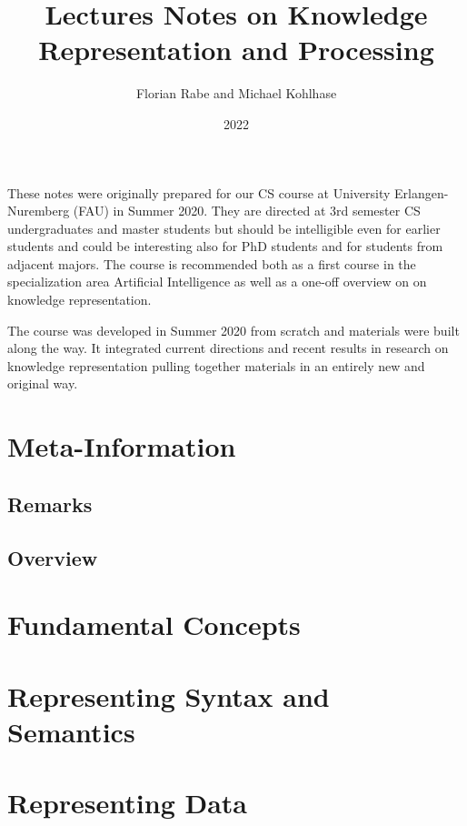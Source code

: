 \documentclass{book}
\title{Lectures Notes on Knowledge Representation and Processing}
\author{Florian Rabe and Michael Kohlhase}
\date{2022}
\begin{document}
\maketitle

\bigskip

These notes were originally prepared for our CS course at University Erlangen-Nuremberg (FAU) in Summer 2020.
They are directed at 3rd semester CS undergraduates and master students but should be intelligible even for earlier students and could be interesting also for PhD students and for students from adjacent majors.
The course is recommended both as a first course in the specialization area Artificial Intelligence as well as a one-off overview on on knowledge representation.

The course was developed in Summer 2020 from scratch and materials were built along the way.
It integrated current directions and recent results in research on knowledge representation pulling together materials in an entirely new and original way.

\tableofcontents

\newpage

\setcounter{chapter}{-1}
\chapter{Meta-Information}
 \section{Remarks}
  
\section{Overview}
  

\chapter{Fundamental Concepts}\label{sec:wuv:concepts}
  

\chapter{Representing Syntax and Semantics}\label{sec:wuv:syntax}
  

\chapter{Representing Data}\label{sec:wuv:codecs}
  
\end{document}
